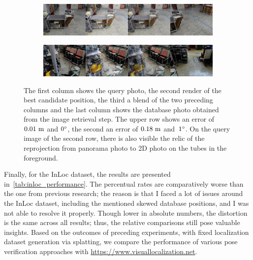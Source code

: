 \begin{figure}
    \centering
    \begin{subfigure}{.95\textwidth}
          \centering
       \includegraphics[width=.95\textwidth]{../graphics/err_0.01m_0deg_results_q_id_3_best_db_1}
    \end{subfigure}%
    
    \begin{subfigure}[width=.95\textwidth]{.95\textwidth}
          \centering
          \includegraphics[width=.95\textwidth]{../graphics/err_0.18m_1deg_results_q_id_137_best_db_1}
    \end{subfigure}
    \caption[Sample localization visualizations]{The first column shows the
    query photo, the second render of the best candidate position, the third
    a blend of the two preceding columns and the last column shows the
    database photo obtained from the image retrieval step. The upper row
    shows an error of $0.01~\mathrm{m}$ and $0^{\circ}$, the second an error of $0.18~\mathrm{m}$
    and~$1^{\circ}$. On the query image of the second row, there is also visible
    the relic of the reprojection from panorama photo to 2D photo on the tubes
    in the foreground.
    }\label{fig:artwin_loc}
\end{figure}





Finally, for the InLoc dataset, the results are presented
in~\cref{tab:inloc_performance}. The percentual rates are comparatively
worse than the one from previous research; the reason is that I faced
a lot of issues around the InLoc dataset, including the mentioned skewed
database positions, and I was not able to resolve it properly.
Though lower in absolute numbers, the distortion is the same across
all results; thus, the relative comparisons still pose valuable insights.
Based on the outcomes of preceding experiments, with fixed localization
dataset generation via splatting, we compare the performance of various
pose verification approaches with \url{https://www.visuallocalization.net}.

